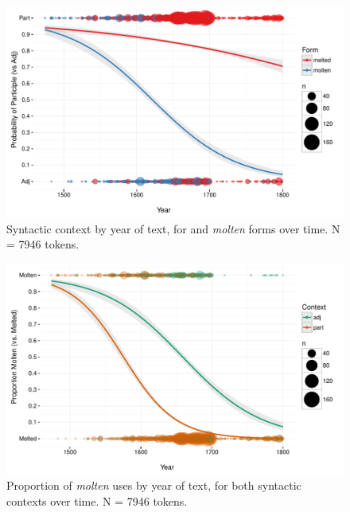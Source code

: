 \documentclass{artikel3}
\begin{document}
\pagebreak 

\begin{figure}
    \begin{center}
    \includegraphics[scale=.6]{ContextByDateUnbinnedWithDots2.pdf}
    \caption{Syntactic context by year of text, for  and \textsl{molten} forms over time. N =  7946 tokens.}
       \label{molten1}
    \end{center}
\end{figure}

\begin{figure}
    \begin{center}
    \includegraphics[scale=.6]{FormByDateUnbinnedWithDots2.pdf}
    \caption{Proportion of \textsl{molten} uses by year of text, for both syntactic contexts over time. N =  7946 tokens.}
       \label{molten2}
    \end{center}
\end{figure}
\end{document}

